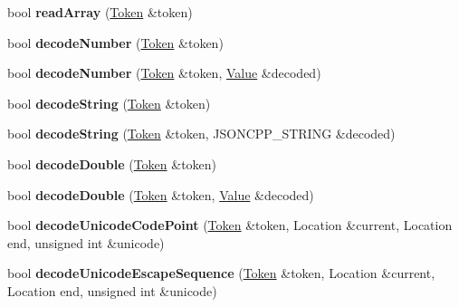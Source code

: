 \begin{DoxyCompactItemize}
\mbox{\label{classJson_1_1Reader_afd9a30c0af205c9f327613f486fae6b8}} 
bool {\bfseries read\+Array} (\hyperlink{classJson_1_1Reader_1_1Token}{Token} \&token)
\item 
\mbox{\label{classJson_1_1Reader_a442d1f23edf0f4350f5eeab3ee3f7d46}} 
bool {\bfseries decode\+Number} (\hyperlink{classJson_1_1Reader_1_1Token}{Token} \&token)
\item 
\mbox{\label{classJson_1_1Reader_a72f426ce3fa384d14aa10e9dd75618f0}} 
bool {\bfseries decode\+Number} (\hyperlink{classJson_1_1Reader_1_1Token}{Token} \&token, \hyperlink{classJson_1_1Value}{Value} \&decoded)
\item 
\mbox{\label{classJson_1_1Reader_aaf736937912f5c9b8d221e57f209e3e0}} 
bool {\bfseries decode\+String} (\hyperlink{classJson_1_1Reader_1_1Token}{Token} \&token)
\item 
\mbox{\label{classJson_1_1Reader_a8911a3225ee94d86d83edc2f8c1befe0}} 
bool {\bfseries decode\+String} (\hyperlink{classJson_1_1Reader_1_1Token}{Token} \&token, J\+S\+O\+N\+C\+P\+P\+\_\+\+S\+T\+R\+I\+NG \&decoded)
\item 
\mbox{\label{classJson_1_1Reader_a2420bbb7fd6d5d3e7e2fea894dd8f70f}} 
bool {\bfseries decode\+Double} (\hyperlink{classJson_1_1Reader_1_1Token}{Token} \&token)
\item 
\mbox{\label{classJson_1_1Reader_a5e4a66be7c413bca86078f14df5eb802}} 
bool {\bfseries decode\+Double} (\hyperlink{classJson_1_1Reader_1_1Token}{Token} \&token, \hyperlink{classJson_1_1Value}{Value} \&decoded)
\item 
\mbox{\label{classJson_1_1Reader_a8fe24db3e9953aef3d637a56447e795c}} 
bool {\bfseries decode\+Unicode\+Code\+Point} (\hyperlink{classJson_1_1Reader_1_1Token}{Token} \&token, Location \&current, Location end, unsigned int \&unicode)
\item 
\mbox{\label{classJson_1_1Reader_a469cb6f55971d7c41fca2752a3aa5bf7}} 
bool {\bfseries decode\+Unicode\+Escape\+Sequence} (\hyperlink{classJson_1_1Reader_1_1Token}{Token} \&token, Location \&current, Location end, unsigned int \&unicode)

\end{DoxyCompactItemize}
